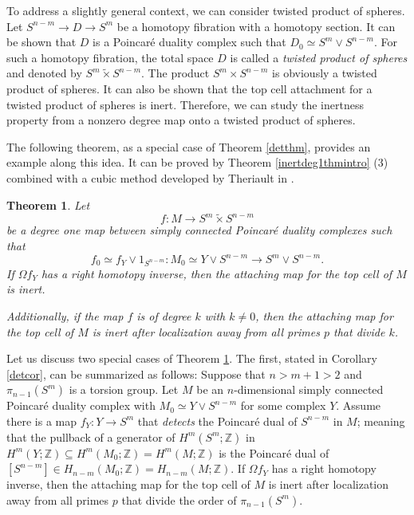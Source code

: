 \documentclass[a4]{amsart}
\newtheorem{theorem}{Theorem}[section]
\theoremstyle{definition}
\begin{document}
\begin{sloppypar}
To address a slightly general context, we can consider twisted product of spheres. 
Let $S^{n-m}\stackrel{}{\longrightarrow} D\stackrel{}{\longrightarrow} S^{m}$ be a homotopy fibration with a homotopy section. It can be shown that $D$ is a Poincar\'{e} duality complex such that $D_0\simeq S^{m} \vee S^{n-m}$. For such a homotopy fibration, the total space $D$ is called a {\it twisted product of spheres} and denoted by $S^{m}\widetilde{\times} S^{n-m}$. The product $S^{m}\times S^{n-m}$ is obviously a twisted product of spheres. It can also be shown that the top cell attachment for a twisted product of spheres is inert. Therefore, we can study the inertness property from a nonzero degree map onto a twisted product of spheres.

The following theorem, as a special case of Theorem \ref{detthm}, provides an example along this idea. It can be proved by Theorem \ref{inertdeg1thmintro} (3) combined with a cubic method developed by Theriault in \cite{The24b}.

\begin{theorem}\label{detthmintro}
Let 
\[
f: M\stackrel{}{\longrightarrow} S^{m}\widetilde{\times} S^{n-m}
\]
be a degree one map between simply connected Poincar\'{e} duality complexes such that
\[
f_0\simeq f_Y\vee 1_{S^{n-m}}: M_0\simeq Y\vee S^{n-m}\stackrel{}{\longrightarrow} S^{m} \vee S^{n-m}.
\]
If $\Omega f_Y$ has a right homotopy inverse, then the attaching map for the top cell of $M$ is inert.

Additionally, if the map $f$ is of degree $k$ with $k\neq 0$, then the attaching map for the top cell of $M$ is inert after localization away from all primes $p$ that divide $k$.
\end{theorem}

Let us discuss two special cases of Theorem \ref{detthmintro}. The first, stated in Corollary \ref{detcor}, can be summarized as follows: 
Suppose that $n>m+1> 2$ and $\pi_{n-1}(S^m)$ is a torsion group. 
Let $M$ be an $n$-dimensional simply connected Poincar\'{e} duality complex with $M_0\simeq Y\vee S^{n-m}$ for some complex $Y$. 
Assume there is a map $f_Y: Y\stackrel{}{\longrightarrow} S^{m}$ that {\it detects} the Poincar\'{e} dual of $S^{n-m}$ in $M$; meaning that the pullback of a generator of $H^m(S^m;\mathbb{Z})$ in $H^m(Y;\mathbb{Z})\subseteq H^{m}(M_0;\mathbb{Z})=H^m(M;\mathbb{Z})$ is the Poincar\'{e} dual of $[S^{n-m}]\in H_{n-m}(M_0;\mathbb{Z})=H_{n-m}(M;\mathbb{Z})$. 
If $\Omega f_Y$ has a right homotopy inverse, then the attaching map for the top cell of $M$ is inert after localization away from all primes $p$ that divide the order of $\pi_{n-1}(S^m)$.



\end{sloppypar}
\end{document}
